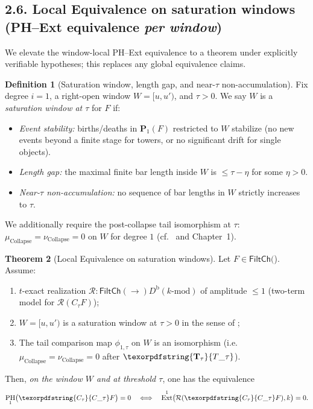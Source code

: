 \documentclass[11pt]{article}
\numberwithin{equation}{section}
\theoremstyle{plain}
\theoremstyle{definition}
\theoremstyle{remark}
\DeclareMathOperator{\Ext}{Ext}
\DeclareMathOperator{\PH}{PH}
\theoremstyle{plain}
\theoremstyle{definition}
\numberwithin{equation}{section}
\newtheorem{theorem}{Theorem}[section]
\theoremstyle{definition}
\newtheorem{definition}[theorem]{Definition}
\DeclareRobustCommand{\FiltCh}[1]{\mathsf{FiltCh}(#1)}
\DeclareRobustCommand{\Ttau}{\texorpdfstring{\ensuremath{\mathbf{T}_{\tau}}}{T\_\tau}}
\DeclareRobustCommand{\Ctau}{\texorpdfstring{\ensuremath{C_{\tau}}}{C\_\tau}}
\numberwithin{equation}{section}
\theoremstyle{plain}
\theoremstyle{definition}
\theoremstyle{remark}
\newcommand{\Dbk}{D^{\mathrm{b}}(k\text{-mod})}
\providecommand{\Cfun}[1]{\mathsf{C}_{#1}}
\providecommand{\Tfun}[1]{\mathbf{T}_{#1}}
\providecommand{\Ctau}{\Cfun{\tau}}
\providecommand{\Ttau}{\Tfun{\tau}}
\begin{document}
\subsection*{2.6. Local Equivalence on saturation windows (PH–Ext equivalence \emph{per window})}
We elevate the window-local PH–Ext equivalence to a theorem under explicitly verifiable hypotheses; this replaces any global equivalence claims.

\begin{definition}[Saturation window, length gap, and near-\(\tau\) non-accumulation]\label{def:saturation}
Fix degree \(i=1\), a right-open window \(W=[u,u')\), and \(\tau>0\).
We say \(W\) is a \emph{saturation window at \(\tau\)} for \(F\) if:
\begin{itemize}[leftmargin=1.25em]
  \item \emph{Event stability:} births/deaths in \(\mathbf{P}_1(F)\) restricted to \(W\) stabilize (no new events beyond a finite stage for towers, or no significant drift for single objects).
  \item \emph{Length gap:} the maximal finite bar length inside \(W\) is \(\le \tau-\eta\) for some \(\eta>0\).
  \item \emph{Near-\(\tau\) non-accumulation:} no sequence of bar lengths in \(W\) strictly increases to \(\tau\).
\end{itemize}
We additionally require the post-collapse tail isomorphism at \(\tau\): \(\mu_{\mathrm{Collapse}}=\nu_{\mathrm{Collapse}}=0\) on \(W\) for degree \(1\) (cf.\  and Chapter~1).
\end{definition}

\begin{theorem}[Local Equivalence on saturation windows]\label{thm:local-equiv}
Let \(F\in\FiltCh\). Assume:
\begin{enumerate}[leftmargin=1.5em]
  \item \(t\)-exact realization \(\mathcal{R}:\FiltCh\to \Dbk\) of amplitude \(\le 1\) (two-term model for \(\mathcal{R}(C_\tau F)\));
  \item \(W=[u,u')\) is a saturation window at \(\tau>0\) in the sense of ;
  \item The tail comparison map \(\phi_{1,\tau}\) on \(W\) is an isomorphism (i.e.\ \(\mu_{\mathrm{Collapse}}=\nu_{\mathrm{Collapse}}=0\) after \(\Ttau\)).
\end{enumerate}
Then, \emph{on the window \(W\) and at threshold \(\tau\)}, one has the equivalence
\[
\PH_1\!\big(\Ctau F\big)=0\quad\Longleftrightarrow\quad \Ext^1\!\big(\mathcal{R}(\Ctau F),k\big)=0.
\]
\end{theorem}
\end{document}
